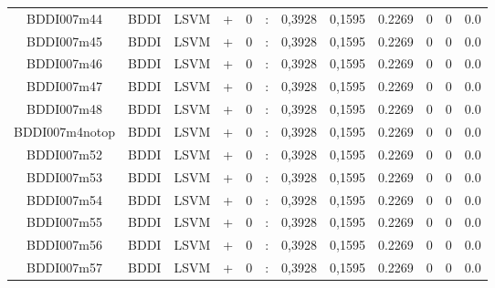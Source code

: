 \documentclass[a4paper]{article}
\begin{document}
\begin{landscape}
\begin{center}
\begin{tabular}{ |c|c|c|c|c|c|c|c|c|c|c|c|}
 
 	
 	\small{ BDDI007m44 } & BDDI & LSVM & +  &  0 &  :  &  0,3928 & 0,1595 & 0.2269  &  0 & 0 & 0.0 \\
 	

 
 	
 	\small{ BDDI007m45 } & BDDI & LSVM & +  &  0 &  :  &  0,3928 & 0,1595 & 0.2269  &  0 & 0 & 0.0 \\
 	

 
 	
 	\small{ BDDI007m46 } & BDDI & LSVM & +  &  0 &  :  &  0,3928 & 0,1595 & 0.2269  &  0 & 0 & 0.0 \\
 	

 
 	
 	\small{ BDDI007m47 } & BDDI & LSVM & +  &  0 &  :  &  0,3928 & 0,1595 & 0.2269  &  0 & 0 & 0.0 \\
 	

 
 	
 	\small{ BDDI007m48 } & BDDI & LSVM & +  &  0 &  :  &  0,3928 & 0,1595 & 0.2269  &  0 & 0 & 0.0 \\
 	

 
 	
 	\small{ BDDI007m4notop } & BDDI & LSVM & +  &  0 &  :  &  0,3928 & 0,1595 & 0.2269  &  0 & 0 & 0.0 \\
 	

 
 	
 	\small{ BDDI007m52 } & BDDI & LSVM & +  &  0 &  :  &  0,3928 & 0,1595 & 0.2269  &  0 & 0 & 0.0 \\
 	

 
 	
 	\small{ BDDI007m53 } & BDDI & LSVM & +  &  0 &  :  &  0,3928 & 0,1595 & 0.2269  &  0 & 0 & 0.0 \\
 	

 
 	
 	\small{ BDDI007m54 } & BDDI & LSVM & +  &  0 &  :  &  0,3928 & 0,1595 & 0.2269  &  0 & 0 & 0.0 \\
 	

 
 	
 	\small{ BDDI007m55 } & BDDI & LSVM & +  &  0 &  :  &  0,3928 & 0,1595 & 0.2269  &  0 & 0 & 0.0 \\
 	

 
 	
 	\small{ BDDI007m56 } & BDDI & LSVM & +  &  0 &  :  &  0,3928 & 0,1595 & 0.2269  &  0 & 0 & 0.0 \\
 	

 
 	
 	\small{ BDDI007m57 } & BDDI & LSVM & +  &  0 &  :  &  0,3928 & 0,1595 & 0.2269  &  0 & 0 & 0.0 \\
 	


\end{tabular}
\end{center}
\end{landscape}
\end{document}
